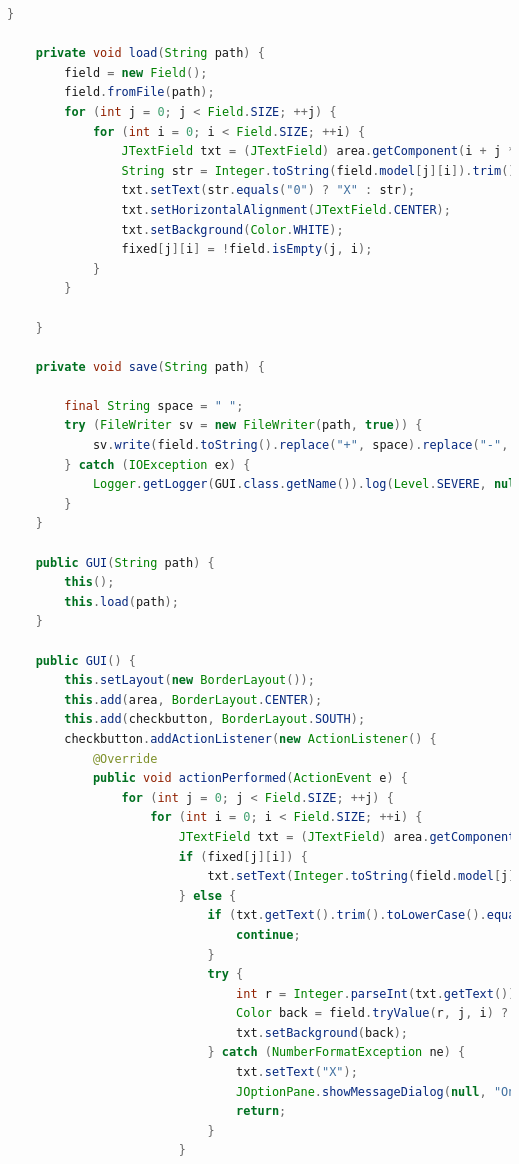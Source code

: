 \documentclass[a4paper,10pt]{article}
\begin{document}
\begin{lstlisting}[language=java]
    }

    private void load(String path) {
        field = new Field();
        field.fromFile(path);
        for (int j = 0; j < Field.SIZE; ++j) {
            for (int i = 0; i < Field.SIZE; ++i) {
                JTextField txt = (JTextField) area.getComponent(i + j * Field.SIZE);
                String str = Integer.toString(field.model[j][i]).trim();    
                txt.setText(str.equals("0") ? "X" : str);
                txt.setHorizontalAlignment(JTextField.CENTER);
                txt.setBackground(Color.WHITE);
                fixed[j][i] = !field.isEmpty(j, i);
            }
        }

    }

    private void save(String path) {

        final String space = " ";
        try (FileWriter sv = new FileWriter(path, true)) {
            sv.write(field.toString().replace("+", space).replace("-", space).replace("|", space).replace("0", "X"));
        } catch (IOException ex) {
            Logger.getLogger(GUI.class.getName()).log(Level.SEVERE, null, ex);
        }
    }

    public GUI(String path) {
        this();
        this.load(path);
    }

    public GUI() {
        this.setLayout(new BorderLayout());
        this.add(area, BorderLayout.CENTER);
        this.add(checkbutton, BorderLayout.SOUTH);
        checkbutton.addActionListener(new ActionListener() {
            @Override
            public void actionPerformed(ActionEvent e) {
                for (int j = 0; j < Field.SIZE; ++j) {
                    for (int i = 0; i < Field.SIZE; ++i) {
                        JTextField txt = (JTextField) area.getComponent(i + j * Field.SIZE);
                        if (fixed[j][i]) {
                            txt.setText(Integer.toString(field.model[j][i]));
                        } else {
                            if (txt.getText().trim().toLowerCase().equals("x")) {
                                continue;
                            }
                            try {
                                int r = Integer.parseInt(txt.getText());
                                Color back = field.tryValue(r, j, i) ? Color.BLUE : Color.RED;
                                txt.setBackground(back);
                            } catch (NumberFormatException ne) {
                                txt.setText("X");
                                JOptionPane.showMessageDialog(null, "Only accepts integers.");
                                return;
                            }
                        }


\end{lstlisting}
\end{document}
